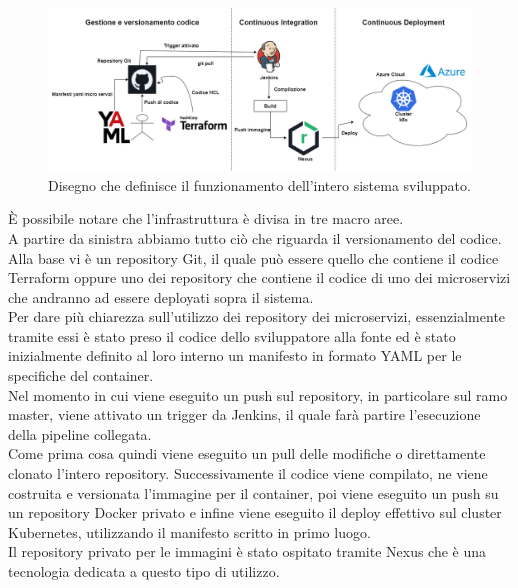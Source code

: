 \documentclass[a4paper,12pt]{report}
\begin{document}
\begin{figure}[h]
	\includegraphics[width=1.0\textwidth]{disegno_struttura_infra}
    \caption{Disegno che definisce il funzionamento dell'intero sistema sviluppato.}
    \label{fig:disegno_struttura_infra}
\end{figure}

È possibile notare che l'infrastruttura è divisa in tre macro aree.\\
A partire da sinistra abbiamo tutto ciò che riguarda il versionamento del codice. Alla base vi è un repository Git, il quale può essere quello che contiene il codice Terraform oppure uno dei repository che contiene il codice di uno dei microservizi che andranno ad essere deployati sopra il sistema.\\
Per dare più chiarezza sull'utilizzo dei repository dei microservizi, essenzialmente tramite essi è stato preso il codice dello sviluppatore alla fonte ed è stato inizialmente definito al loro interno un manifesto in formato YAML per le specifiche del container.\\
Nel momento in cui viene eseguito un push sul repository, in particolare sul ramo master, viene attivato un trigger da Jenkins, il quale farà partire l'esecuzione della pipeline collegata.\\
Come prima cosa quindi viene eseguito un pull delle modifiche o direttamente clonato l'intero repository. Successivamente il codice viene compilato, ne viene costruita e versionata l'immagine per il container, poi viene eseguito un push su un repository Docker privato e infine viene eseguito il deploy effettivo sul cluster Kubernetes, utilizzando il manifesto scritto in primo luogo.\\
Il repository privato per le immagini è stato ospitato tramite Nexus che è una tecnologia dedicata a questo tipo di utilizzo.
\end{document}
